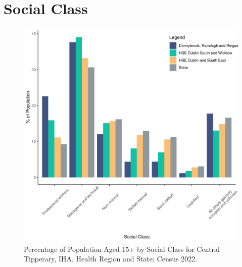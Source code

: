 \documentclass{article}
\begin{document}
\section{Social Class}\label{sect:SC}
\begin{figure}[H]
	\centering
	\includegraphics[width = 140mm]{../figures/SocialClassED.pdf}
	\caption{Percentage of Population Aged 15+ by Social Class for Central Tipperary, IHA, Health Region and State; Census 2022.}
	\label{fig:vbnv}
	\end{figure}
\end{document}
